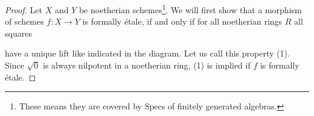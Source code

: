 \documentclass[9pt,twosided]{amsart}
\begin{document}
\begin{proof}
  Let $X$ and $Y$ be noetherian schemes\footnote{These means they are covered by $\mathrm{Spec}$s of finitely generated algebras.}. 
  We will first show that a morphism of schemes $f:X\to Y$ is formally étale,
  if and only if for all noetherian rings $R$ all squares
  \begin{center}
  \end{center}
  have a unique lift like indicated in the diagram. Let us call this property (1).
  Since $\sqrt{0}$ is always nilpotent in a noetherian ring, (1) is implied if $f$ is formally étale.
  

\end{proof}
\end{document}
